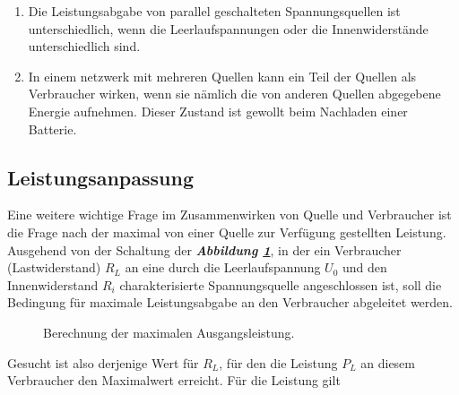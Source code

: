 \begin{enumerate}[$(a)$]
\item Die Leistungsabgabe von parallel geschalteten Spannungsquellen ist unterschiedlich, wenn die Leerlaufspannungen oder die Innenwiderstände unterschiedlich sind.
\item In einem netzwerk mit mehreren Quellen kann ein Teil der Quellen als Verbraucher wirken, wenn sie nämlich die von anderen Quellen abgegebene Energie aufnehmen. Dieser Zustand ist gewollt beim Nachladen einer Batterie. 
\end{enumerate}
\subsection{Leistungsanpassung}
Eine weitere wichtige Frage im Zusammenwirken von Quelle und Verbraucher ist die Frage nach der maximal von einer Quelle zur Verfügung gestellten Leistung. Ausgehend von der Schaltung der \textbf{\textit{Abbildung \ref{fig_IIIz}}}, in der ein Verbraucher (Lastwiderstand) $R_L$ an eine durch die Leerlaufspannung $U_0$ und den Innenwiderstand $R_i$ charakterisierte Spannungsquelle angeschlossen ist, soll die Bedingung für maximale Leistungsabgabe an den Verbraucher abgeleitet werden.
\begin{figure}[H]
\centering
\caption{Berechnung der maximalen Ausgangsleistung.}
\label{fig_IIIz}
\end{figure}
\noindent Gesucht ist also derjenige Wert für $R_L$, für den die Leistung $P_L$ an diesem Verbraucher den Maximalwert erreicht. Für die Leistung gilt
